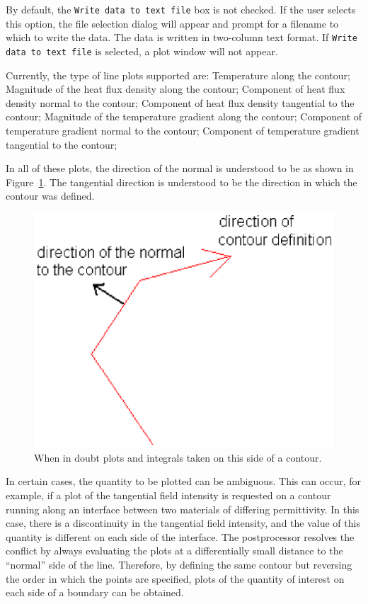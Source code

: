 By default, the \texttt{Write data to text file} box is not
checked. If the user selects this option, the file selection dialog
will appear and prompt for a filename to which to write the data.
The data is written in two-column text format. If \texttt{Write
data to text file} is selected, a plot window will not appear.

Currently, the type of line plots supported are: Temperature along the
contour; Magnitude of the heat flux density along the contour; Component of heat flux
density normal to the contour; Component of heat flux density tangential to the
contour; Magnitude of the temperature gradient along the contour; Component of
temperature gradient normal to the contour; Component of temperature gradient
tangential to the contour;

In all of these plots, the direction of the normal is understood to
be as shown in Figure~\ref{hfig20}. The tangential direction is
understood to be the direction in which the contour was defined.

\begin{figure}[htbp]
\centerline{\includegraphics{belaman20.eps}}
\caption{When in doubt plots and integrals taken on this side of a contour.}
\label{hfig20}
\end{figure}




In certain cases, the quantity to be plotted can be ambiguous. This
can occur, for example, if a plot of the tangential field intensity
is requested on a contour running along an interface between two
materials of differing permittivity. In this case, there is a
discontinuity in the tangential field intensity, and the value of
this quantity is different on each side of the interface. The
postprocessor resolves the conflict by always evaluating the plots
at a differentially small distance to the ``normal'' side of the
line. Therefore, by defining the same contour but reversing the
order in which the points are specified, plots of the quantity of
interest on each side of a boundary can be obtained.


